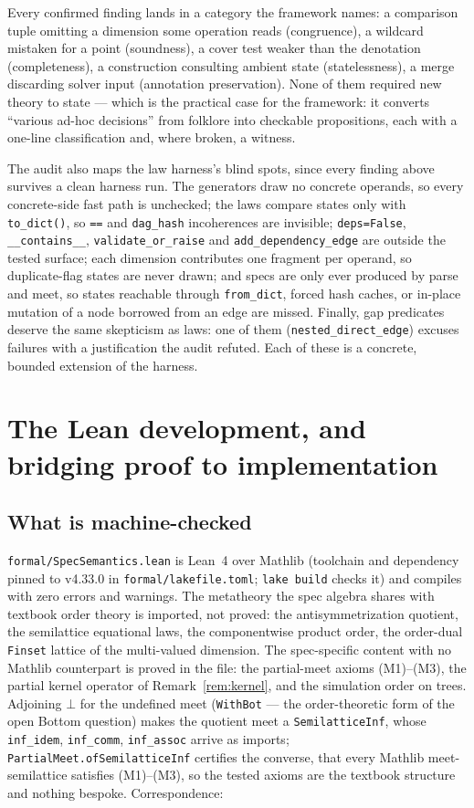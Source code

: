 \documentclass[11pt]{article}
\theoremstyle{definition}
\theoremstyle{remark}
\newcommand{\code}[1]{\texttt{#1}}
\begin{document}
Every confirmed finding lands in a category the framework names: a
comparison tuple omitting a dimension some operation reads (congruence), a
wildcard mistaken for a point (soundness), a cover test weaker than the
denotation (completeness), a construction consulting ambient state
(statelessness), a merge discarding solver input (annotation preservation).
None of them required new theory to state --- which is the practical case
for the framework: it converts ``various ad-hoc decisions'' from folklore
into checkable propositions, each with a one-line classification and, where
broken, a witness.

The audit also maps the law harness's blind spots, since every finding above
survives a clean harness run.  The generators draw no concrete operands, so
every concrete-side fast path is unchecked; the laws compare states only
with \code{to\_dict()}, so \code{==} and \code{dag\_hash} incoherences are
invisible; \code{deps=False}, \code{\_\_contains\_\_},
\code{validate\_or\_raise} and \code{add\_dependency\_edge} are outside the
tested surface; each dimension contributes one fragment per operand, so
duplicate-flag states are never drawn; and specs are only ever produced by
parse and meet, so states reachable through \code{from\_dict}, forced hash
caches, or in-place mutation of a node borrowed from an edge are missed.
Finally, gap predicates deserve the same skepticism as laws: one of them
(\code{nested\_direct\_edge}) excuses failures with a justification the
audit refuted.  Each of these is a concrete, bounded extension of the
harness.

\section{The Lean development, and bridging proof to implementation}
\label{sec:lean}

\subsection{What is machine-checked}

\code{formal/SpecSemantics.lean} is Lean~4 over Mathlib (toolchain and
dependency pinned to v4.33.0 in \code{formal/lakefile.toml}; \code{lake
build} checks it) and compiles with zero errors and warnings.  The
metatheory the spec algebra shares with textbook order theory is imported,
not proved: the antisymmetrization quotient, the semilattice equational
laws, the componentwise product order, the order-dual \code{Finset}
lattice of the multi-valued dimension.  The spec-specific content with no
Mathlib counterpart is proved in the file: the partial-meet axioms
(M1)--(M3), the partial kernel operator of Remark~\ref{rem:kernel}, and
the simulation order on trees.  Adjoining
$\bot$ for the undefined meet (\code{WithBot} --- the order-theoretic form
of the open Bottom question) makes the quotient meet a
\code{SemilatticeInf}, whose \code{inf\_idem}, \code{inf\_comm},
\code{inf\_assoc} arrive as imports; \code{PartialMeet.ofSemilatticeInf}
certifies the converse, that every Mathlib meet-semilattice satisfies
(M1)--(M3), so the tested axioms are the textbook structure and nothing
bespoke.  Correspondence:
\end{document}
